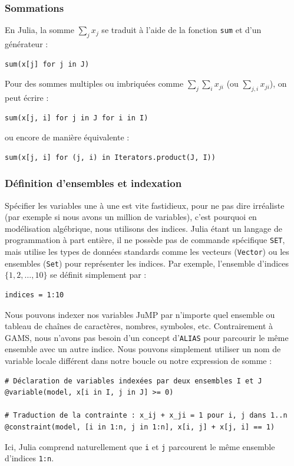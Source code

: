 \subsubsection{Sommations}

En Julia, la somme $\sum_j x_j$ se traduit à l'aide de la fonction \verb|sum| et d'un générateur :
\begin{verbatim}
sum(x[j] for j in J)
\end{verbatim}
Pour des sommes multiples ou imbriquées comme $\sum_j \sum_i x_{ji}$ (ou $\sum_{j,i} x_{ji}$), on peut écrire :
\begin{verbatim}
sum(x[j, i] for j in J for i in I)
\end{verbatim}
ou encore de manière équivalente :
\begin{verbatim}
sum(x[j, i] for (j, i) in Iterators.product(J, I))
\end{verbatim}

\subsubsection{Définition d'ensembles et indexation}

Spécifier les variables une à une est vite fastidieux, pour ne pas dire irréaliste (par exemple si nous avons un million de variables), c'est pourquoi en modélisation algébrique, nous utilisons des indices.
Julia étant un langage de programmation à part entière, il ne possède pas de commande spécifique \verb|SET|, mais utilise les types de données standards comme les vecteurs (\verb|Vector|) ou les ensembles (\verb|Set|) pour représenter les indices.
Par exemple, l'ensemble d'indices $\lbrace 1,2,\ldots,10 \rbrace$ se définit simplement par :
\begin{verbatim}
indices = 1:10
\end{verbatim}
Nous pouvons indexer nos variables JuMP par n'importe quel ensemble ou tableau de chaînes de caractères, nombres, symboles, etc.
Contrairement à GAMS, nous n'avons pas besoin d'un concept d'\verb|ALIAS| pour parcourir le même ensemble avec un autre indice. Nous pouvons simplement utiliser un nom de variable locale différent dans notre boucle ou notre expression de somme :
\begin{verbatim}
# Déclaration de variables indexées par deux ensembles I et J
@variable(model, x[i in I, j in J] >= 0)

# Traduction de la contrainte : x_ij + x_ji = 1 pour i, j dans 1..n
@constraint(model, [i in 1:n, j in 1:n], x[i, j] + x[j, i] == 1)
\end{verbatim}
Ici, Julia comprend naturellement que \verb|i| et \verb|j| parcourent le même ensemble d'indices \verb|1:n|.

